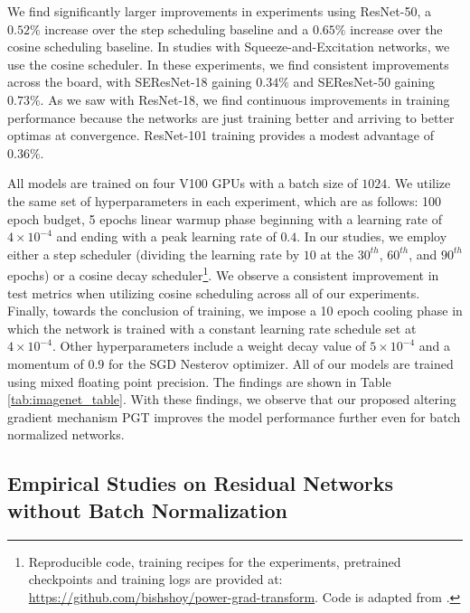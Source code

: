 \documentclass[times,sort&compress]{elsarticle}
\begin{document}
We find significantly larger improvements in experiments using ResNet-50, a $0.52\%$
increase over the step scheduling baseline and a $0.65\%$ increase over the cosine
scheduling baseline. In studies with Squeeze-and-Excitation networks, we use the cosine
scheduler. In these experiments, we find consistent improvements across the board, with
SEResNet-18 \cite{hu2018squeeze} gaining $0.34\%$ and SEResNet-50 \cite{hu2018squeeze}
gaining $0.73\%$. As we saw with ResNet-18, we find continuous improvements in training
performance because the networks are just training better and arriving to better optimas
at convergence. ResNet-101 training provides a modest advantage of $0.36\%$.

All models are trained on four V100 GPUs with a batch size of $1024$. We utilize the
same set of hyperparameters in each experiment, which are as follows: 100 epoch budget,
5 epochs linear warmup phase beginning with a learning rate of $4\times 10^{-4}$ and
ending with a peak learning rate of $0.4$. In our studies, we employ either a step
scheduler (dividing the learning rate by $10$ at the $30^{th}$, $60^{th}$, and $90^{th}$
epochs) or a cosine decay scheduler\footnote{Reproducible code, training recipes for the
experiments, pretrained checkpoints and training logs are provided at: \\
\url{https://github.com/bishshoy/power-grad-transform}. Code is adapted from
\cite{rw2019timm}.}. We observe a consistent improvement in test metrics when utilizing
cosine scheduling across all of our experiments. Finally, towards the conclusion of
training, we impose a 10 epoch cooling phase in which the network is trained with a
constant learning rate schedule set at $4\times 10^{-4}$. Other hyperparameters include
a weight decay value of $5\times 10^{-4}$ and a momentum of $0.9$ for the SGD Nesterov
optimizer. All of our models are trained using mixed floating point precision. The
findings are shown in Table \ref{tab:imagenet_table}. With these findings, we observe
that our proposed altering gradient mechanism PGT improves the model performance further
even for batch normalized networks.












\subsection{Empirical Studies on Residual Networks without Batch Normalization}
\label{sec:Empi}
\end{document}
